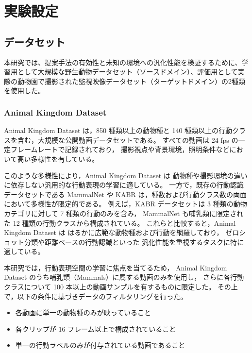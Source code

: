 \chapter{実験設定}
\label{chap:experiment_settings}

\section{データセット}
本研究では、提案手法の有効性と未知の環境への汎化性能を検証するために、学習用として大規模な野生動物データセット（ソースドメイン）、評価用として実際の動物園で撮影された監視映像データセット（ターゲットドメイン）の2種類を使用した。

\subsection{Animal Kingdom Dataset}
Animal Kingdom Dataset \cite{ng2022animal} は，850 種類以上の動物種と
140 種類以上の行動クラスを含む，大規模な公開動画データセットである。
すべての動画は 24 fps の一定フレームレートで記録されており，
撮影視点や背景環境，照明条件などにおいて高い多様性を有している。

このような多様性により，Animal Kingdom Dataset は
動物種や撮影環境の違いに依存しない汎用的な行動表現の学習に適している。
一方で，既存の行動認識データセットである MammalNet \cite{mammalnet}
や KABR \cite{kabr} は，種数および行動クラス数の両面において多様性が限定的である。
例えば，KABR データセットは 3 種類の動物カテゴリに対して
7 種類の行動のみを含み，
MammalNet も哺乳類に限定された 12 種類の行動クラスから構成されている。
これらと比較すると，Animal Kingdom Dataset は
はるかに広範な動物種および行動を網羅しており，
ゼロショット分類や距離ベースの行動認識といった
汎化性能を重視するタスクに特に適している。

本研究では，行動表現空間の学習に焦点を当てるため，
Animal Kingdom Dataset のうち哺乳類（Mammals）に属する動画のみを使用し，
さらに各行動クラスについて 100 本以上の動画サンプルを有するものに限定した。
その上で，以下の条件に基づきデータのフィルタリングを行った。

\begin{itemize}
  \item 各動画に単一の動物種のみが映っていること
  \item 各クリップが 16 フレーム以上で構成されていること
  \item 単一の行動ラベルのみが付与されている動画であること
\end{itemize}


